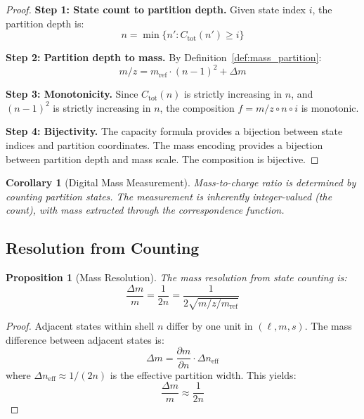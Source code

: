 \documentclass[twocolumn,10pt]{article}
\newtheorem{proposition}[theorem]{Proposition}
\newtheorem{corollary}[theorem]{Corollary}
\begin{document}
\begin{proof}
\textbf{Step 1: State count to partition depth.}
Given state index $i$, the partition depth is:
\begin{equation}
    n = \min\{n' : C_{\text{tot}}(n') \geq i\}
\end{equation}

\textbf{Step 2: Partition depth to mass.}
By Definition~\ref{def:mass_partition}:
\begin{equation}
    m/z = m_{\text{ref}} \cdot (n-1)^2 + \Delta m
\end{equation}

\textbf{Step 3: Monotonicity.}
Since $C_{\text{tot}}(n)$ is strictly increasing in $n$, and $(n-1)^2$ is strictly increasing in $n$, the composition $f = m/z \circ n \circ i$ is monotonic.

\textbf{Step 4: Bijectivity.}
The capacity formula provides a bijection between state indices and partition coordinates. The mass encoding provides a bijection between partition depth and mass scale. The composition is bijective.
\end{proof}

\begin{corollary}[Digital Mass Measurement]
Mass-to-charge ratio is determined by counting partition states. The measurement is inherently integer-valued (the count), with mass extracted through the correspondence function.
\end{corollary}

\subsection{Resolution from Counting}

\begin{proposition}[Mass Resolution]
The mass resolution from state counting is:
\begin{equation}
    \frac{\Delta m}{m} = \frac{1}{2n} = \frac{1}{2\sqrt{m/z / m_{\text{ref}}}}
\end{equation}
\end{proposition}

\begin{proof}
Adjacent states within shell $n$ differ by one unit in $(\ell, m, s)$. The mass difference between adjacent states is:
\begin{equation}
    \Delta m = \frac{\partial m}{\partial n} \cdot \Delta n_{\text{eff}}
\end{equation}
where $\Delta n_{\text{eff}} \approx 1/(2n)$ is the effective partition width. This yields:
\begin{equation}
    \frac{\Delta m}{m} \approx \frac{1}{2n}
\end{equation}
\end{proof}
\end{document}
